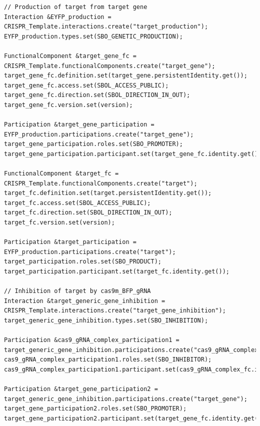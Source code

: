 \vspace{\abovedisplayskip}
\begin{minipage}{0.95\textwidth}%
\begin{lstlisting}
// Production of target from target gene
Interaction &EYFP_production = CRISPR_Template.interactions.create("target_production"); 
EYFP_production.types.set(SBO_GENETIC_PRODUCTION);

FunctionalComponent &target_gene_fc = CRISPR_Template.functionalComponents.create("target_gene");
target_gene_fc.definition.set(target_gene.persistentIdentity.get());
target_gene_fc.access.set(SBOL_ACCESS_PUBLIC);
target_gene_fc.direction.set(SBOL_DIRECTION_IN_OUT);
target_gene_fc.version.set(version);

Participation &target_gene_participation = EYFP_production.participations.create("target_gene"); 
target_gene_participation.roles.set(SBO_PROMOTER);
target_gene_participation.participant.set(target_gene_fc.identity.get());

FunctionalComponent &target_fc = CRISPR_Template.functionalComponents.create("target");
target_fc.definition.set(target.persistentIdentity.get());
target_fc.access.set(SBOL_ACCESS_PUBLIC);
target_fc.direction.set(SBOL_DIRECTION_IN_OUT);
target_fc.version.set(version);

Participation &target_participation = EYFP_production.participations.create("target"); 
target_participation.roles.set(SBO_PRODUCT);
target_participation.participant.set(target_fc.identity.get());

// Inhibition of target by cas9m_BFP_gRNA 
Interaction &target_generic_gene_inhibition = CRISPR_Template.interactions.create("target_gene_inhibition"); 
target_generic_gene_inhibition.types.set(SBO_INHIBITION);

Participation &cas9_gRNA_complex_participation1 = target_generic_gene_inhibition.participations.create("cas9_gRNA_complex");
cas9_gRNA_complex_participation1.roles.set(SBO_INHIBITOR);
cas9_gRNA_complex_participation1.participant.set(cas9_gRNA_complex_fc.identity.get());
	
Participation &target_gene_participation2 = target_generic_gene_inhibition.participations.create("target_gene"); 
target_gene_participation2.roles.set(SBO_PROMOTER);
target_gene_participation2.participant.set(target_gene_fc.identity.get());
\end{lstlisting}
\end{minipage}

